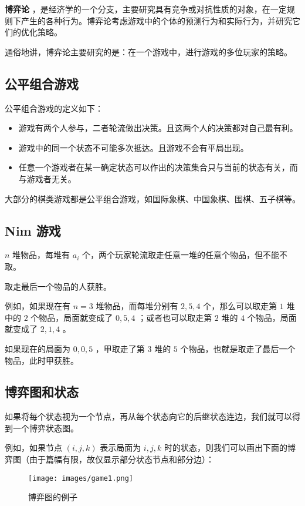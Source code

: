 
\textbf{ 博弈论 }，是经济学的一个分支，主要研究具有竞争或对抗性质的对象，在一定规则下产生的各种行为。博弈论考虑游戏中的个体的预测行为和实际行为，并研究它们的优化策略。

通俗地讲，博弈论主要研究的是：在一个游戏中，进行游戏的多位玩家的策略。

\subsection{公平组合游戏}

公平组合游戏的定义如下：

\begin{itemize}
\item 游戏有两个人参与，二者轮流做出决策。且这两个人的决策都对自己最有利。
\item 游戏中的同一个状态不可能多次抵达。且游戏不会有平局出现。
\item 任意一个游戏者在某一确定状态可以作出的决策集合只与当前的状态有关，而与游戏者无关。
\end{itemize}

大部分的棋类游戏都是公平组合游戏，如国际象棋、中国象棋、围棋、五子棋等。

\subsection{Nim 游戏}

$n$ 堆物品，每堆有 $a_i$ 个，两个玩家轮流取走任意一堆的任意个物品，但不能不取。

取走最后一个物品的人获胜。

例如，如果现在有 $n=3$ 堆物品，而每堆分别有 $2, 5, 4$ 个，那么可以取走第 $1$ 堆中的 $2$ 个物品，局面就变成了 $0, 5, 4$ ；或者也可以取走第 $2$ 堆的 $4$ 个物品，局面就变成了 $2, 1, 4$ 。

如果现在的局面为 $0, 0, 5$ ，甲取走了第 $3$ 堆的 $5$ 个物品，也就是取走了最后一个物品，此时甲获胜。

\subsection{博弈图和状态}

如果将每个状态视为一个节点，再从每个状态向它的后继状态连边，我们就可以得到一个博弈状态图。

例如，如果节点 $(i, j, k)$ 表示局面为 $i, j, k$ 时的状态，则我们可以画出下面的博弈图（由于篇幅有限，故仅显示部分状态节点和部分边）：

\begin{figure}[h]
\centering
\texttt{[image: images/game1.png]} 
\caption{博弈图的例子}
\end{figure}

